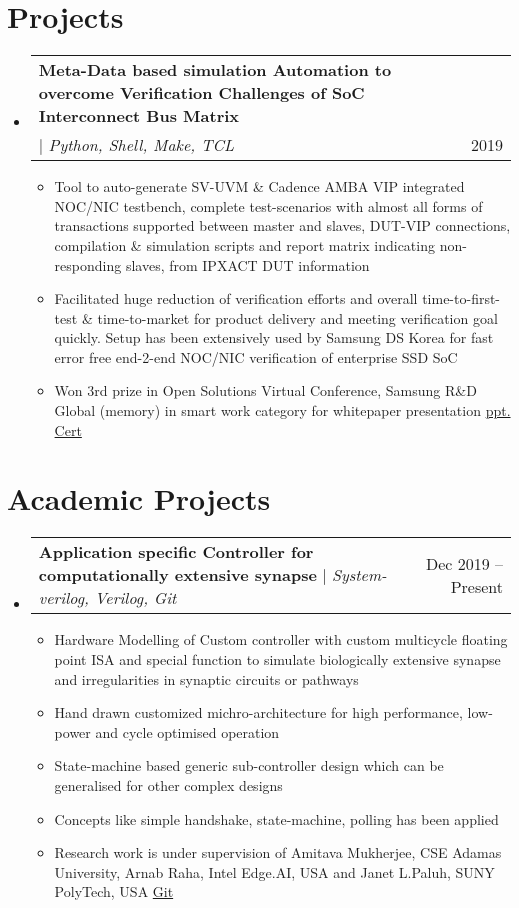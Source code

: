 \documentclass[letterpaper,11pt]{article}
\makeatletter
\newcommand{\resumeItem}[1]{
  \item\small{
    {#1 \vspace{-2pt}}
  }
}
\newcommand{\resumeProjectHeading}[2]{
    \item
    \begin{tabular*}{0.97\textwidth}{l@{\extracolsep{\fill}}r}
      \small#1 & #2 \\
    \end{tabular*}\vspace{-7pt}
}
\newcommand{\resumeSubHeadingListStart}{\begin{itemize}[leftmargin=0.15in, label={}]}
\newcommand{\resumeSubHeadingListEnd}{\end{itemize}}
\newcommand{\resumeItemListStart}{\begin{itemize}}
\newcommand{\resumeItemListEnd}{\end{itemize}\vspace{-5pt}}
\makeatother
\begin{document}
\section{Projects}
    \resumeSubHeadingListStart
         \resumeProjectHeading
           {\textbf{\footnotesize Meta-Data based simulation Automation to overcome Verification Challenges of SoC Interconnect Bus Matrix} \\$|$ \emph{\footnotesize Python, Shell, Make, TCL}}{\footnotesize2019}
          \resumeItemListStart
            \resumeItem{\footnotesize Tool to auto-generate SV-UVM \& Cadence AMBA VIP integrated NOC/NIC testbench, complete test-scenarios with almost all forms of transactions supported between master and slaves, DUT-VIP connections, compilation \& simulation scripts and report matrix indicating non-responding slaves, from IPXACT DUT information}
            \resumeItem{\footnotesize Facilitated huge reduction of verification efforts and overall time-to-first-test \& time-to-market for product delivery and meeting verification goal quickly. Setup has been extensively used by Samsung DS Korea for fast error free end-2-end NOC/NIC verification of enterprise SSD SoC}
            \resumeItem{\footnotesize Won 3rd prize in Open Solutions Virtual Conference, Samsung R\&D Global (memory) in smart work category for whitepaper presentation {\href{https://drive.google.com/drive/folders/1Gwz2QKZ8dhCaXF0ewuTx7EFH2R4yN0SL}{{\color{blue}ppt.}}} {\href{https://drive.google.com/drive/u/1/folders/1r8ccSlHbASb0m3f7x-lZKThSCp7RLJgy}{{\color{blue}Cert}}}}
          \resumeItemListEnd
    \resumeSubHeadingListEnd


\section{Academic Projects}
    \resumeSubHeadingListStart
      \resumeProjectHeading
          {\textbf{\footnotesize Application specific Controller for computationally extensive synapse} $|$ \emph{\footnotesize System-verilog, Verilog, Git}}{\footnotesize Dec 2019 -- Present}
          \resumeItemListStart
            \resumeItem{\footnotesize Hardware Modelling of Custom controller with custom multicycle floating point ISA and special function to simulate biologically extensive synapse and irregularities in synaptic circuits or pathways}
            \resumeItem{\footnotesize Hand drawn customized michro-architecture for high performance, low-power and cycle optimised operation}
            \resumeItem{\footnotesize State-machine based generic sub-controller design which can be generalised for other complex designs}
            \resumeItem{\footnotesize Concepts like simple handshake, state-machine, polling has been applied}
            \resumeItem{\footnotesize Research work is under supervision of Amitava Mukherjee, CSE Adamas University, Arnab Raha, Intel Edge.AI, USA and Janet L.Paluh, SUNY PolyTech, USA {\href{https://github.com/Soham-coder/processor}{\color{blue}Git}}}
          \resumeItemListEnd
    \resumeSubHeadingListEnd
    
\end{document}
